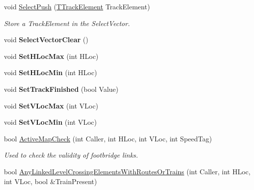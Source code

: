 \begin{DoxyCompactItemize}
\mbox{\label{class_t_track_a512c7a382dec9379b6796c73363599e5}} 
void \mbox{\hyperlink{class_t_track_a512c7a382dec9379b6796c73363599e5}{Select\+Push}} (\mbox{\hyperlink{class_t_track_element}{T\+Track\+Element}} Track\+Element)
\begin{DoxyCompactList}\small\item\em Store a Track\+Element in the Select\+Vector. \end{DoxyCompactList}\item 
\mbox{\label{class_t_track_a212b9df26c2d6653b841912cd4557b8f}} 
void {\bfseries Select\+Vector\+Clear} ()
\item 
\mbox{\label{class_t_track_a453e9074035359dc22be2b15913e4bab}} 
void {\bfseries Set\+H\+Loc\+Max} (int H\+Loc)
\item 
\mbox{\label{class_t_track_a30e9bd8b4f5e2fb3f01b8c94a98d79f3}} 
void {\bfseries Set\+H\+Loc\+Min} (int H\+Loc)
\item 
\mbox{\label{class_t_track_a98e6a381eec13868c31a28f450c1a361}} 
void {\bfseries Set\+Track\+Finished} (bool Value)
\item 
\mbox{\label{class_t_track_ad33eb8c757120a0fc52ba43c9c8a3293}} 
void {\bfseries Set\+V\+Loc\+Max} (int V\+Loc)
\item 
\mbox{\label{class_t_track_a6459d38cdb82ae38f54f4a1de4935e09}} 
void {\bfseries Set\+V\+Loc\+Min} (int V\+Loc)
\item 
\mbox{\label{class_t_track_a0b0e7c333d860841aed4b66b94a6a955}} 
bool \mbox{\hyperlink{class_t_track_a0b0e7c333d860841aed4b66b94a6a955}{Active\+Map\+Check}} (int Caller, int H\+Loc, int V\+Loc, int Speed\+Tag)
\begin{DoxyCompactList}\small\item\em Used to check the validity of footbridge links. \end{DoxyCompactList}\item 
\mbox{\label{class_t_track_a54678551db16086c8d269808884075d2}} 
bool \mbox{\hyperlink{class_t_track_a54678551db16086c8d269808884075d2}{Any\+Linked\+Level\+Crossing\+Elements\+With\+Routes\+Or\+Trains}} (int Caller, int H\+Loc, int V\+Loc, bool \&Train\+Present)

\end{DoxyCompactItemize}
